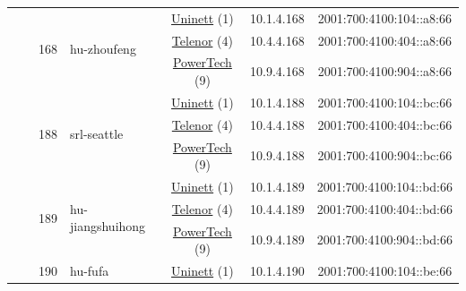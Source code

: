\begin{small}
\begin{center}
\begin{longtable}{|c|c|c|c|c|c|c|c|}
  &  & \multirow{3}{*}{\tiny{168}} & \multicolumn{1}{|l|}{\multirow{3}{*}{\tiny{hu-zhoufeng}}} & \multicolumn{2}{|c|}{\tiny{\href{https://www.uninett.no}{Uninett} (1)}} & \tiny{10.1.4.168} & \tiny{2001:700:4100:104::a8:66} \\* \cline{5-5}\cline{6-6}\cline{7-7}\cline{8-8}
  &  &  &  & \multicolumn{2}{|c|}{\tiny{\href{https://www.telenor.no}{Telenor} (4)}} & \tiny{10.4.4.168} & \tiny{2001:700:4100:404::a8:66} \\* \cline{5-5}\cline{6-6}\cline{7-7}\cline{8-8}
  &  &  &  & \multicolumn{2}{|c|}{\tiny{\href{http://www.powertech.no}{PowerTech} (9)}} & \tiny{10.9.4.168} & \tiny{2001:700:4100:904::a8:66} \\* \cline{3-3}\cline{4-4}\cline{5-5}\cline{6-6}\cline{7-7}\cline{8-8}
  &  & \multirow{3}{*}{\tiny{188}} & \multicolumn{1}{|l|}{\multirow{3}{*}{\tiny{srl-seattle}}} & \multicolumn{2}{|c|}{\tiny{\href{https://www.uninett.no}{Uninett} (1)}} & \tiny{10.1.4.188} & \tiny{2001:700:4100:104::bc:66} \\* \cline{5-5}\cline{6-6}\cline{7-7}\cline{8-8}
  &  &  &  & \multicolumn{2}{|c|}{\tiny{\href{https://www.telenor.no}{Telenor} (4)}} & \tiny{10.4.4.188} & \tiny{2001:700:4100:404::bc:66} \\* \cline{5-5}\cline{6-6}\cline{7-7}\cline{8-8}
  &  &  &  & \multicolumn{2}{|c|}{\tiny{\href{http://www.powertech.no}{PowerTech} (9)}} & \tiny{10.9.4.188} & \tiny{2001:700:4100:904::bc:66} \\* \cline{3-3}\cline{4-4}\cline{5-5}\cline{6-6}\cline{7-7}\cline{8-8}
  &  & \multirow{3}{*}{\tiny{189}} & \multicolumn{1}{|l|}{\multirow{3}{*}{\tiny{hu-jiangshuihong}}} & \multicolumn{2}{|c|}{\tiny{\href{https://www.uninett.no}{Uninett} (1)}} & \tiny{10.1.4.189} & \tiny{2001:700:4100:104::bd:66} \\* \cline{5-5}\cline{6-6}\cline{7-7}\cline{8-8}
  &  &  &  & \multicolumn{2}{|c|}{\tiny{\href{https://www.telenor.no}{Telenor} (4)}} & \tiny{10.4.4.189} & \tiny{2001:700:4100:404::bd:66} \\* \cline{5-5}\cline{6-6}\cline{7-7}\cline{8-8}
  &  &  &  & \multicolumn{2}{|c|}{\tiny{\href{http://www.powertech.no}{PowerTech} (9)}} & \tiny{10.9.4.189} & \tiny{2001:700:4100:904::bd:66} \\* \cline{3-3}\cline{4-4}\cline{5-5}\cline{6-6}\cline{7-7}\cline{8-8}
  &  & \multirow{3}{*}{\tiny{190}} & \multicolumn{1}{|l|}{\multirow{3}{*}{\tiny{hu-fufa}}} & \multicolumn{2}{|c|}{\tiny{\href{https://www.uninett.no}{Uninett} (1)}} & \tiny{10.1.4.190} & \tiny{2001:700:4100:104::be:66} \\* \cline{5-5}\cline{6-6}\cline{7-7}\cline{8-8}

\end{longtable}
\end{center}
\end{small}
